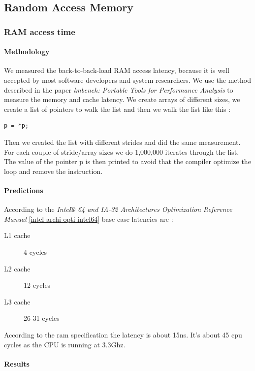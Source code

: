 \subsection{Random Access Memory}

\subsubsection{RAM access time}
\paragraph{Methodology}
We measured the back-to-back-load RAM access latency, because it is well accepted by most software developers and system researchers.
We use the method described in the paper \emph{lmbench: Portable Tools for Performance Analysis} to measure the memory and cache latency.
We create arrays of different sizes, we create a list of pointers to walk the list and then we walk the list like this :
\begin{verbatim}
p = *p;
\end{verbatim}

Then we created the list with different strides and did the same measurement.
For each couple of stride/array sizes we do 1,000,000 iterates through the list.
The value of the pointer p is then printed to avoid that the compiler optimize the loop and remove the instruction.

\paragraph{Predictions}
According to the \emph{Intel® 64 and IA-32 Architectures Optimization Reference Manual}
\ref{intel-archi-opti-intel64} base case latencies are :
\begin{description}
\item[L1 cache] 4 cycles
\item[L2 cache] 12 cycles
\item[L3 cache] 26-31 cycles
\end{description}
According to the ram specification the latency is about 15ns.
It's about 45 cpu cycles as the CPU is running at 3.3Ghz.

\paragraph{Results}

\begin{center}
\end{center}
